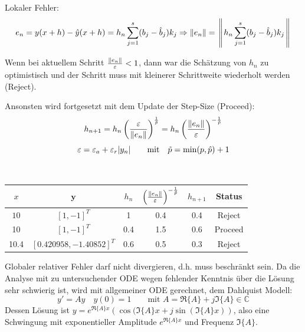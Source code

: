         Lokaler Fehler:
        $$e_n = y(x+h) - \hat{y}(x+h) = h_n \sum\limits_{j=1}^s (b_j - \hat{b}_j)k_j \Rightarrow 
        \Arrowvert e_n \Arrowvert = \left\Arrowvert h_n \sum\limits_{j=1}^s (b_j - \hat{b}_j)k_j \right\Arrowvert$$
          
        
        \begin{minipage}{7.5cm}
          Wenn bei aktuellem Schritt $\frac{\Arrowvert e_n \Arrowvert}{\varepsilon} < 1$, dann war die
          Schätzung von $h_n$ zu optimistisch und der Schritt muss mit kleinerer Schrittweite wiederholt
          werden (Reject). 
          
          Ansonsten wird fortgesetzt mit dem Update der Step-Size (Proceed): 
          $$h_{n+1} = h_n \left( \frac{\varepsilon}{\Arrowvert e_n \Arrowvert} \right)^{\frac{1}{\tilde{p}}}= 
          h_n \left( \frac{\Arrowvert e_n \Arrowvert}{\varepsilon} \right)^{-\frac{1}{\tilde{p}}}$$
          $$\varepsilon=\varepsilon_a+\varepsilon_r|y_n|
           \text{\qquad mit\quad} \tilde{p} = \min(p, \hat{p})+1$$
        \end{minipage}
        \hspace{0.5cm}
        \begin{minipage}{10.5cm}
          \\
          \begin{tabular}{cccccc}
            \hline
            $x$ & $\bm y$ & $h_n$ & $\left( \frac{\Arrowvert e_n \Arrowvert}{\varepsilon} \right)^{-\frac{1}{\tilde{p}}}$ & $h_{n+1}$ & Status \\
            \hline
            $10$ & $[1, -1]^T$ & 1 & 0.4 & 0.4 & Reject\\
            10 & $[1,-1]^T$ & 0.4 & 1.5 & 0.6 & Proceed\\
            10.4 & $[0.420958, -1.40852]^T$ & 0.6 & 0.5 & 0.3 & Reject\\
            \hline
          \end{tabular}
        \end{minipage}
        
        
        
      Globaler relativer Fehler darf nicht divergieren, d.h. muss beschränkt sein. 
      Da die Analyse mit zu untersuchender ODE wegen fehlender Kenntnis über die Lösung sehr schwierig
      ist, wird mit allgemeiner ODE gerechnet, dem Dahlquist Modell: 
      $$y' = A y \quad y(0) = 1 \qquad \text{mit } A = \Re\{A\} + j \Im\{A\} \in \mathbb{C}$$
      Dessen Lösung ist $y = e^{\Re\{A\} x} \left( \cos(\Im\{A\}x + j \sin(\Im\{A\} x) \right)$, also 
      eine Schwingung mit exponentieller Amplitude $e^{\Re\{A\} x}$ und Frequenz $\Im\{A\}$.
      
